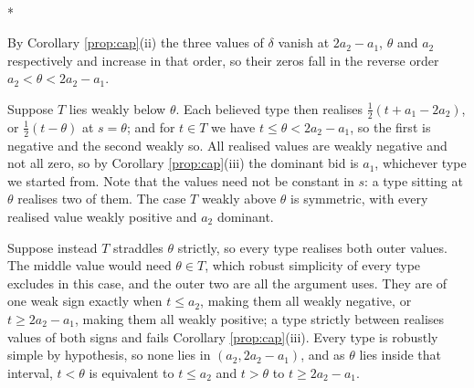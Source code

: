 \documentclass[12pt]{article}
\makeatletter
\theoremstyle{definition}
\renewenvironment{proof}[1][\proofname]{\par
  \pushQED{\qed}%
  \normalfont \topsep6\p@\@plus6\p@\relax
  \trivlist
  \item[\hskip\labelsep\itshape #1\@addpunct{.}]\mbox{}\\*
  \ignorespaces
}{%
  \popQED\endtrivlist\@endpefalse
}
\makeatother
\begin{document}
\begin{proof}[Proof of Corollary \ref{cor:sepool}]
By Corollary \ref{prop:cap}(ii) the three values of $\delta$ vanish at $2a_2 - a_1$, $\theta$ and $a_2$ respectively and increase in that order, so their zeros fall in the reverse order $a_2 < \theta < 2a_2 - a_1$.

Suppose $T$ lies weakly below $\theta$. Each believed type then realises $\tfrac12(t + a_1 - 2a_2)$, or $\tfrac12(t - \theta)$ at $s = \theta$; and for $t \in T$ we have $t \le \theta < 2a_2 - a_1$, so the first is negative and the second weakly so. All realised values are weakly negative and not all zero, so by Corollary \ref{prop:cap}(iii) the dominant bid is $a_1$, whichever type we started from. Note that the values need not be constant in $s$: a type sitting at $\theta$ realises two of them. The case $T$ weakly above $\theta$ is symmetric, with every realised value weakly positive and $a_2$ dominant.

Suppose instead $T$ straddles $\theta$ strictly, so every type realises both outer values. The middle value would need $\theta \in T$, which robust simplicity of every type excludes in this case, and the outer two are all the argument uses. They are of one weak sign exactly when $t \le a_2$, making them all weakly negative, or $t \ge 2a_2 - a_1$, making them all weakly positive; a type strictly between realises values of both signs and fails Corollary \ref{prop:cap}(iii). Every type is robustly simple by hypothesis, so none lies in $(a_2, 2a_2 - a_1)$, and as $\theta$ lies inside that interval, $t < \theta$ is equivalent to $t \le a_2$ and $t > \theta$ to $t \ge 2a_2 - a_1$.
\end{proof}
\end{document}
